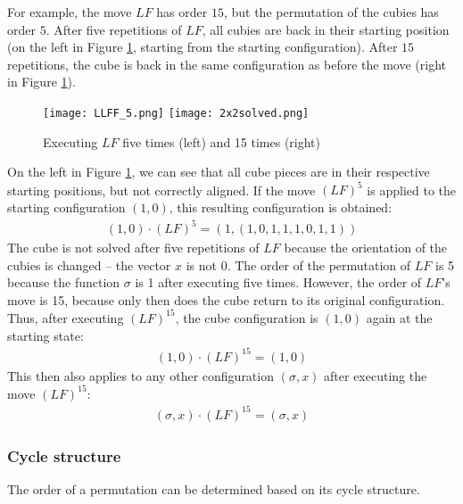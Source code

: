\begin{example}
    
For example, the move $LF$ has order $15$, but the permutation of the cubies has order $5$. After five repetitions of $LF$, all cubies are back in their starting position (on the left in Figure \ref{Figure_LF_5_15}, starting from the starting configuration). After $15$ repetitions, the cube is back in the same configuration as before the move (right in Figure \ref{Figure_LF_5_15}).

\begin{figure}[H]
\centering
\texttt{[image: LLFF\_5.png]}
\texttt{[image: 2x2solved.png]}
\caption{Executing $LF$ five times (left) and 15 times (right)}
\label{Figure_LF_5_15}
\end{figure}

On the left in Figure \ref{Figure_LF_5_15}, we can see that all cube pieces are in their respective starting positions, but not correctly aligned. If the move $(LF)^5$ is applied to the starting configuration $(1,0)$, this resulting configuration is obtained:
\begin{align*}
(1,0) \cdot (LF)^5 = (1, (1,0,1,1,1,0,1,1))
\end{align*}
The cube is not solved after five repetitions of $LF$ because the orientation of the cubies is changed -- the vector $x$ is not 0. The order of the permutation of $LF$ is 5 because the function $\sigma$ is 1 after executing five times. However, the order of $LF$'s move is 15, because only then does the cube return to its original configuration. Thus, after executing $(LF)^{15}$, the cube configuration is $(1,0)$ again at the starting state:
\begin{align*}
(1,0) \cdot (LF)^{15} = (1,0)
\end{align*}
This then also applies to any other configuration $(\sigma, x)$ after executing the move $(LF)^{15}$:
\begin{align*}
(\sigma, x) \cdot (LF)^{15} = (\sigma, x)
\end{align*}
\end{example}


\subsubsection*{Cycle structure}
\label{section_cycle structure}

The order of a permutation can be determined based on its cycle structure. 

